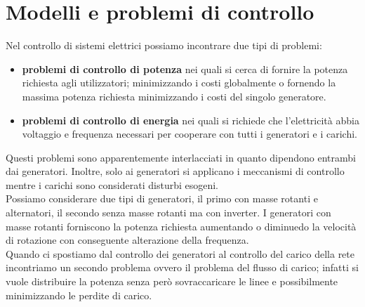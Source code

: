 \label{capitolo4}
\section{Modelli e problemi di controllo}
Nel controllo di sistemi elettrici possiamo incontrare due tipi di problemi:
\begin{itemize}
\item \textbf{problemi di controllo di potenza} nei quali si cerca di fornire la potenza richiesta agli utilizzatori; minimizzando i costi globalmente o fornendo la massima potenza richiesta minimizzando i costi del singolo generatore.
\item \textbf{problemi di controllo di energia} nei quali si richiede che l'elettricità abbia voltaggio e frequenza necessari per cooperare con tutti i generatori e i carichi. 
\end{itemize}
Questi problemi sono apparentemente interlacciati in quanto dipendono entrambi dai generatori. Inoltre, solo ai generatori si applicano i meccanismi di controllo mentre i carichi sono considerati disturbi esogeni.\\
Possiamo considerare due tipi di generatori, il primo con masse rotanti e alternatori, il secondo senza masse rotanti ma con inverter.
I generatori con masse rotanti forniscono la potenza richiesta aumentando o diminuedo la velocità di rotazione con conseguente alterazione della frequenza.\\
Quando ci spostiamo dal controllo dei generatori al controllo del carico della rete incontriamo un secondo problema ovvero il problema del flusso di carico; infatti si vuole distribuire la potenza senza però sovraccaricare le linee e possibilmente minimizzando le perdite di carico.\\
